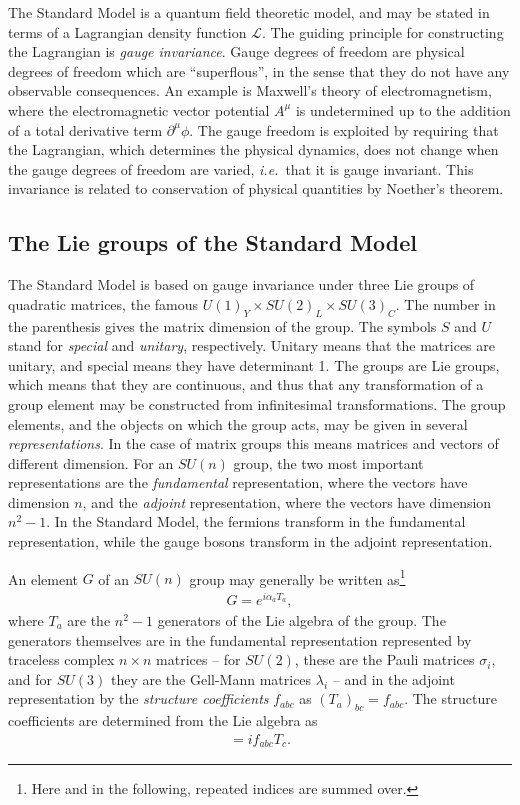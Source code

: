 The Standard Model is a quantum field theoretic model, and may be stated in terms of a Lagrangian density function $\mathcal{L}$. The guiding principle for constructing the Lagrangian is {\it gauge invariance}. Gauge degrees of freedom are physical degrees of freedom which are ``superflous'', in the sense that they do not have any observable consequences. An example is Maxwell's theory of electromagnetism, where the electromagnetic vector potential $A^\mu$ is undetermined up to the addition of a total derivative term $\partial^\mu \phi$. The gauge freedom is exploited by requiring that the Lagrangian, which determines the physical dynamics, does not change when the gauge degrees of freedom are varied, {\it i.e.}\ that it is gauge invariant. This invariance is related to conservation of physical quantities by Noether's theorem.

\subsection{The Lie groups of the Standard Model}

The Standard Model is based on gauge invariance under three Lie groups of quadratic matrices, the famous $U(1)_Y\times SU(2)_L\times SU(3)_C$. The number in the parenthesis gives the matrix dimension of the group. The symbols $S$ and $U$ stand for {\it special} and {\it unitary}, respectively. Unitary means that the matrices are unitary, and special means they have determinant 1. The groups are Lie groups, which means that they are continuous, and thus that any transformation of a group element may be constructed from infinitesimal transformations. The group elements, and the objects on which the group acts, may be given in several {\it representations}. In the case of matrix groups this means matrices and vectors of different dimension. For an $SU(n)$ group, the two most important representations are the {\it fundamental} representation, where the vectors have dimension $n$, and the {\it adjoint} representation, where the vectors have dimension $n^2-1$. In the Standard Model, the fermions transform in the fundamental representation, while the gauge bosons transform in the adjoint representation.

An element $G$ of an $SU(n)$ group may generally be written as\footnote{Here and in the following, repeated indices are summed over.} 
\begin{align}
	G = e^{i\alpha_a T_a},
\end{align}
where $T_a$ are the $n^2-1$ generators of the Lie algebra of the group. The generators themselves are in the fundamental representation represented by traceless complex $n\times n$ matrices -- for $SU(2)$, these are the Pauli matrices $\sigma_i$, and for $SU(3)$ they are the Gell-Mann matrices $\lambda_i$ -- and in the adjoint representation by the {\it structure coefficients} $f_{abc}$ as $(T_a)_{bc} = f_{abc}$. The structure coefficients are determined from the Lie algebra as
\begin{align}
	[T_a, T_b] = i f_{abc}T_c.
\end{align}

